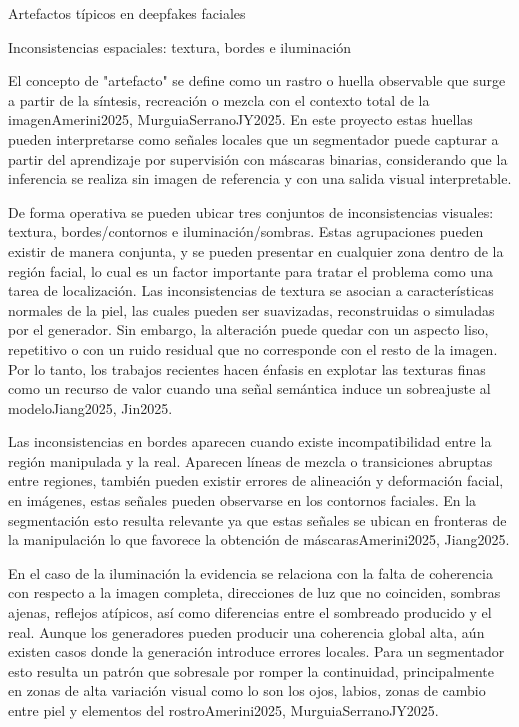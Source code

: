 Artefactos típicos en deepfakes faciales

Inconsistencias espaciales: textura, bordes e iluminación

El concepto de "artefacto" se define como un rastro o huella observable que surge a partir de la síntesis, recreación o mezcla con el contexto total de la imagenAmerini2025, MurguiaSerranoJY2025. En este proyecto estas huellas pueden interpretarse como señales locales que un segmentador puede capturar a partir del aprendizaje por supervisión con máscaras binarias, considerando que la inferencia se realiza sin imagen de referencia y con una salida visual interpretable. 

De forma operativa se pueden ubicar tres conjuntos de inconsistencias visuales: textura, bordes/contornos e iluminación/sombras. Estas agrupaciones pueden existir de manera conjunta, y se pueden presentar en cualquier zona dentro de la región facial, lo cual es un factor importante para tratar el problema como una tarea de localización.
Las inconsistencias de textura se asocian a características normales de la piel, las cuales pueden ser suavizadas, reconstruidas o simuladas por el generador. Sin embargo, la alteración puede quedar con un aspecto liso, repetitivo o con un ruido residual que no corresponde con el resto de la imagen. Por lo tanto, los trabajos recientes hacen énfasis en explotar las texturas finas como un recurso de valor cuando una señal semántica induce un sobreajuste al modeloJiang2025, Jin2025.

Las inconsistencias en bordes aparecen cuando existe incompatibilidad entre la región manipulada y la real. Aparecen líneas de mezcla o transiciones abruptas entre regiones, también pueden existir errores de alineación y deformación facial, en imágenes, estas señales pueden observarse en los contornos faciales. En la segmentación esto resulta relevante ya que estas señales se ubican en fronteras de la manipulación lo que favorece la obtención de máscarasAmerini2025, Jiang2025.

En el caso de la iluminación la evidencia se relaciona con la falta de coherencia con respecto a la imagen completa, direcciones de luz que no coinciden, sombras ajenas, reflejos atípicos, así como diferencias entre el sombreado producido y el real. Aunque los generadores pueden producir una coherencia global alta, aún existen casos donde la generación introduce errores locales. Para un segmentador esto resulta un patrón que sobresale por romper la continuidad, principalmente en zonas de alta variación visual como lo son los ojos, labios, zonas de cambio entre piel y elementos del rostroAmerini2025, MurguiaSerranoJY2025.

